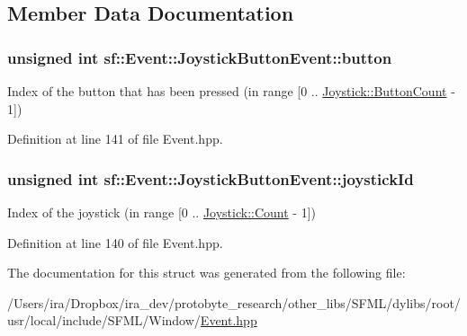 \subsection{Member Data Documentation}
\hypertarget{structsf_1_1_event_1_1_joystick_button_event_a6412e698a2f7904c5aa875a0d1b34da4}{
\subsubsection[{button}]{\setlength{\rightskip}{0pt plus 5cm}unsigned int sf\-::\-Event\-::\-Joystick\-Button\-Event\-::button}}\label{structsf_1_1_event_1_1_joystick_button_event_a6412e698a2f7904c5aa875a0d1b34da4}


Index of the button that has been pressed (in range \mbox{[}0 .. \hyperlink{classsf_1_1_joystick_ac4ca4ee36e2cf04ecf931316e4463ca6a2f1b8a0a59f2c12a4775c0e1e69e1816}{Joystick\-::\-Button\-Count} -\/ 1\mbox{]}) 



Definition at line 141 of file Event.\-hpp.

\hypertarget{structsf_1_1_event_1_1_joystick_button_event_a2f80ecdb964a5ae0fc30726a404c41ec}{
\subsubsection[{joystick\-Id}]{\setlength{\rightskip}{0pt plus 5cm}unsigned int sf\-::\-Event\-::\-Joystick\-Button\-Event\-::joystick\-Id}}\label{structsf_1_1_event_1_1_joystick_button_event_a2f80ecdb964a5ae0fc30726a404c41ec}


Index of the joystick (in range \mbox{[}0 .. \hyperlink{classsf_1_1_joystick_ac4ca4ee36e2cf04ecf931316e4463ca6a6e0a2a95bc1da277610c04d80f52715e}{Joystick\-::\-Count} -\/ 1\mbox{]}) 



Definition at line 140 of file Event.\-hpp.



The documentation for this struct was generated from the following file\-:\begin{DoxyCompactItemize}
\item 
/\-Users/ira/\-Dropbox/ira\-\_\-dev/protobyte\-\_\-research/other\-\_\-libs/\-S\-F\-M\-L/dylibs/root/usr/local/include/\-S\-F\-M\-L/\-Window/\hyperlink{_event_8hpp}{Event.\-hpp}\end{DoxyCompactItemize}
